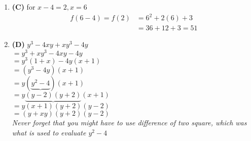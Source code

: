 \begin{multicols}{2}
\begin{enumerate}[label={\textbf{\arabic*.}}]
    \item \textbf{(C)} for $x - 4 = 2, x = 6$ 
    \begin{align*} 
        f(6 - 4 ) = f(2) &= 6^2 + 2(6) + 3 \\
        & = 36 + 12 + 3  = 51
    \end{align*}

    \item \textbf{(D)} $y^3 - 4xy + xy^3 - 4y$ \\
     $= y^3 + xy^3 - 4xy - 4y$ \\
        $= y^3(1 + x) -4y (x + 1)$ \\
        $= (y^3 -4y)(x + 1)$ \\
        $= y(\underbrace{y^2 -4})(x+1)$ \\
        $= y\underbrace{(y-2)(y+2)}(x+1)$ \\
        $= y(x+1)(y+2)(y-2)$ \\
        $= (y + xy)(y+2)(y-2)$ \\
    \textit{Never forget that you might have to use difference of two square, which was what is used to evaluate $y^2 -4$}
    


\end{enumerate}
\end{multicols}
